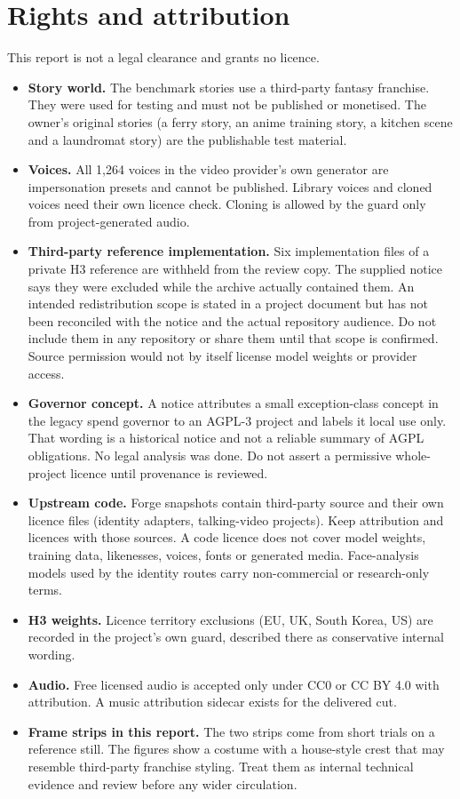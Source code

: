 \documentclass[11pt,a4paper]{article}
\begin{document}
\section{Rights and attribution}
\label{sec:rights}
This report is not a legal clearance and grants no licence.
\begin{itemize}
\item \textbf{Story world.} The benchmark stories use a third-party fantasy franchise. They were used for testing and must not be published or monetised. The owner's original stories (a ferry story, an anime training story, a kitchen scene and a laundromat story) are the publishable test material.
\item \textbf{Voices.} All 1,264 voices in the video provider's own generator are impersonation presets and cannot be published. Library voices and cloned voices need their own licence check. Cloning is allowed by the guard only from project-generated audio.
\item \textbf{Third-party reference implementation.} Six implementation files of a private H3 reference are withheld from the review copy. The supplied notice says they were excluded while the archive actually contained them. An intended redistribution scope is stated in a project document but has not been reconciled with the notice and the actual repository audience. Do not include them in any repository or share them until that scope is confirmed. Source permission would not by itself license model weights or provider access.
\item \textbf{Governor concept.} A notice attributes a small exception-class concept in the legacy spend governor to an AGPL-3 project and labels it local use only. That wording is a historical notice and not a reliable summary of AGPL obligations. No legal analysis was done. Do not assert a permissive whole-project licence until provenance is reviewed.
\item \textbf{Upstream code.} Forge snapshots contain third-party source and their own licence files (identity adapters, talking-video projects). Keep attribution and licences with those sources. A code licence does not cover model weights, training data, likenesses, voices, fonts or generated media. Face-analysis models used by the identity routes carry non-commercial or research-only terms.
\item \textbf{H3 weights.} Licence territory exclusions (EU, UK, South Korea, US) are recorded in the project's own guard, described there as conservative internal wording.
\item \textbf{Audio.} Free licensed audio is accepted only under CC0 or CC BY 4.0 with attribution. A music attribution sidecar exists for the delivered cut.
\item \textbf{Frame strips in this report.} The two strips come from short trials on a reference still. The figures show a costume with a house-style crest that may resemble third-party franchise styling. Treat them as internal technical evidence and review before any wider circulation.
\end{itemize}
\end{document}
